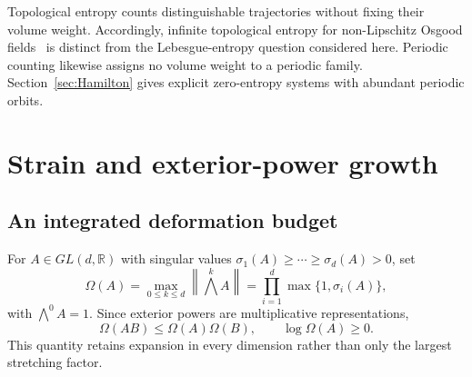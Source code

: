 \documentclass[review,12pt,times,a4paper,nopreprintline]{elsarticle}
\theoremstyle{plain}
\theoremstyle{definition}
\theoremstyle{remark}
\newcommand{\R}{\mathbb R}
\numberwithin{equation}{section}
\begin{document}
Topological entropy counts distinguishable trajectories without fixing their volume weight. Accordingly, infinite topological entropy for non-Lipschitz Osgood fields~\cite{JohanssonMescolini} is distinct from the Lebesgue-entropy question considered here. Periodic counting likewise assigns no volume weight to a periodic family. Section~\ref{sec:Hamilton} gives explicit zero-entropy systems with abundant periodic orbits.

\section{Strain and exterior-power growth}\label{sec:strain}
\subsection{An integrated deformation budget}
For $A\in GL(d,\R)$ with singular values $\sigma_1(A)\geq\cdots\geq\sigma_d(A)>0$, set
\begin{equation}\label{eq:Omega}
 \Omega(A)=\max_{0\leq k\leq d}\left\|\bigwedge^kA\right\|
 =\prod_{i=1}^d\max\{1,\sigma_i(A)\},
\end{equation}
with $\bigwedge^0A=1$. Since exterior powers are multiplicative representations,
\begin{equation}\label{eq:OmegaSub}
 \Omega(AB)\leq\Omega(A)\Omega(B),\qquad \log\Omega(A)\geq0.
\end{equation}
This quantity retains expansion in every dimension rather than only the largest stretching factor.
\end{document}
